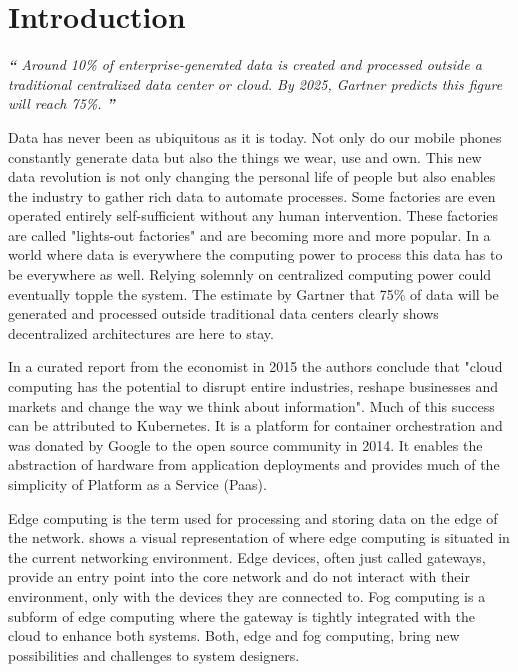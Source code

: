 \section{Introduction}
\begin{displayquote}
\textit{\textbf{\Huge{``}}
\large{Around 10\% of enterprise-generated data is created and processed outside a traditional centralized data center or cloud. By 2025, Gartner predicts this figure will reach 75\%.\cite{gartnerEdgeComputing:online}}
\textbf{\Huge{''}}}
\\[1pt]
\end{displayquote}
Data has never been as ubiquitous as it is today. Not only do our mobile phones constantly generate data but also the things we wear, use and own. This new data revolution is not only changing the personal life of people but also enables the industry to gather rich data to automate processes. Some factories are even operated entirely self-sufficient without any human intervention. These factories are called "lights-out factories" and are becoming more and more popular\cite{wheresmyRobotLightsOut33:online}. In a world where data is everywhere the computing power to process this data has to be everywhere as well. Relying solemnly on centralized computing power could eventually topple the system. The estimate by Gartner that 75\% of data will be generated and processed outside traditional data centers clearly shows decentralized architectures are here to stay\cite{gartnerEdgeComputing:online}.

In a curated report from the economist in 2015 the authors conclude that "cloud computing has the potential to disrupt entire industries, reshape businesses and markets and change the way we think about information"\cite{PuttogetEconomistCloud13:online}. Much of this success can be attributed to Kubernetes. It is a platform for container orchestration and was donated by Google to the open source community in 2014\cite{WhatisKubernetes87:online}. It enables the abstraction of hardware from application deployments and provides much of the simplicity of Platform as a Service (Paas)\cite{WhatisKubernetes87:online}.

Edge computing is the term used for processing and storing data on the edge of the network.  shows a visual representation of where edge computing is situated in the current networking environment. Edge devices, often just called gateways, provide an entry point into the core network and do not interact with their environment, only with the devices they are connected to. Fog computing is a subform of edge computing where the gateway is tightly integrated with the cloud to enhance both systems. Both, edge and fog computing, bring new possibilities and challenges to system designers.

